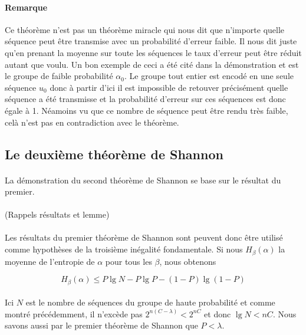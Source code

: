 	\paragraph{Remarque}
	Ce théorème n'est pas un théorème miracle qui nous dit que n'importe quelle séquence peut être transmise avec un probabilité d'erreur faible.
	Il nous dit juste qu'en prenant la moyenne sur toute les séquences le taux d'erreur peut être réduit autant que voulu. Un bon exemple
	de ceci a été cité dans la démonstration et est le groupe de faible probabilité $\alpha_0$. Le groupe tout entier est encodé en une 
	seule séquence $u_0$ donc à partir d'ici il est impossible de retouver précisément quelle séquence a été transmisse et la probabilité
	d'erreur sur ces séquences est donc égale à 1. Néamoins vu que ce nombre de séquence peut être rendu très faible, celà n'est pas en 
	contradiction avec le théorème.
	
\subsection{Le deuxième théorème de Shannon}

	\paragraph{}La démonstration du second théorème de Shannon se base sur le résultat du premier. 
	
	\paragraph{}
	(Rappels résultats et lemme)
	
	\paragraph{}
	Les résultats du premier théorème de Shannon sont peuvent donc être utilisé comme hypothèses de la troisième inégalité fondamentale.
	Si nous $H_\beta(\alpha)$ la moyenne de l'entropie de $\alpha$ pour tous les $\beta$, nous obtenons
	
	\[H_\beta(\alpha)\le P\lg N - P\lg P - (1-P)\lg(1-P)\]
	
	\paragraph{}
	Ici $N$ est le nombre de séquences du groupe de haute probabilité et comme montré précédemment, il n'excède pas $2^{n(C-\lambda)}<2^{nC}$
	et donc $\lg N<nC$. Nous savons aussi par le premier théorème de Shannon que $P<\lambda$.
	
